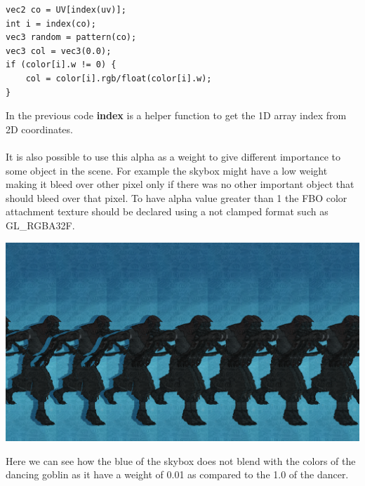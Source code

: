 \documentclass[12pt, a4paper]{article}
\begin{document}
\begin{lstlisting}[caption={Second pass color blending},captionpos=b]
vec2 co = UV[index(uv)];
int i = index(co);
vec3 random = pattern(co);
vec3 col = vec3(0.0);
if (color[i].w != 0) {
    col = color[i].rgb/float(color[i].w);
}
\end{lstlisting}
In the previous code \textbf{index} is a helper function to get the 1D array index from 2D coordinates.\\\\
It is also possible to use this alpha as a weight to give different importance to some object in the scene. For example the skybox might have a low weight
making it bleed over other pixel only if there was no other important object that should bleed over that pixel.
To have alpha value greater than 1 the FBO color attachment texture should be declared using a not clamped format such as GL\_RGBA32F.
\begin{center}
    \centering
    \includegraphics[width=1.0\textwidth]{img/dance.png}
\end{center}
Here we can see how the blue of the skybox does not blend with the colors of the dancing goblin as it have a weight of 0.01 as compared to the
1.0 of the dancer.
\end{document}

